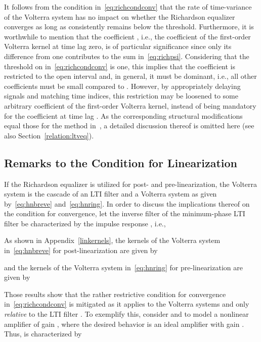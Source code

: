 \documentclass[10pt,twocolumn,twoside]{IEEEtran}
\begin{document}
It follows from the condition in~\eqref{eq:richcondconv}
that the rate of time-variance of the Volterra system
has no impact on whether the Richardson equalizer converges as long as
 consistently remains below the threshold. Furthermore, it is worthwhile to mention that the coefficient ,
i.e., the coefficient of the first-order Volterra kernel
at time lag zero, is of particular significance since only its
difference from one contributes to the sum in~\eqref{eq:richpsi}.
Considering that the threshold on  in~\eqref{eq:richcondconv} is one,
this implies that the coefficient  is restricted to the open
interval  and, in general, it must be dominant, i.e.,
all other coefficients must be small compared to
. However, by appropriately delaying signals and
matching time indices, this restriction may be loosened
to some arbitrary coefficient of the first-order
Volterra kernel, instead of being mandatory for the coefficient at time lag .
As the corresponding structural modifications equal those for the method
in~\cite{soudan2012}, a detailed discussion thereof is omitted here
(see also Section~\ref{relation:ltveq}).

\subsection{Remarks to the Condition for Linearization}

If the Richardson equalizer is utilized for post- and pre-linearization,
the Volterra system  is the cascade of an LTI filter and a Volterra
system as given by~\eqref{eq:hnbreve} and~\eqref{eq:hnring}.
In order to discuss the implications thereof on the condition for convergence,
let the inverse filter  of the minimum-phase LTI filter 
be characterized by the impulse response , i.e.,

As shown in Appendix~\ref{linkernels}, the kernels of the Volterra
system  in~\eqref{eq:hnbreve} for post-linearization are given by

and the kernels of the Volterra system  in~\eqref{eq:hnring}
for pre-linearization are given by

Those results show that the rather restrictive condition for
convergence in~\eqref{eq:richcondconv} is mitigated as it applies
to the Volterra systems  and  only \emph{relative}
to the LTI filter . To exemplify this, consider  and
 to model a nonlinear amplifier of gain , where the
desired behavior  is an ideal amplifier with gain . Thus,
 is characterized by
\end{document}
